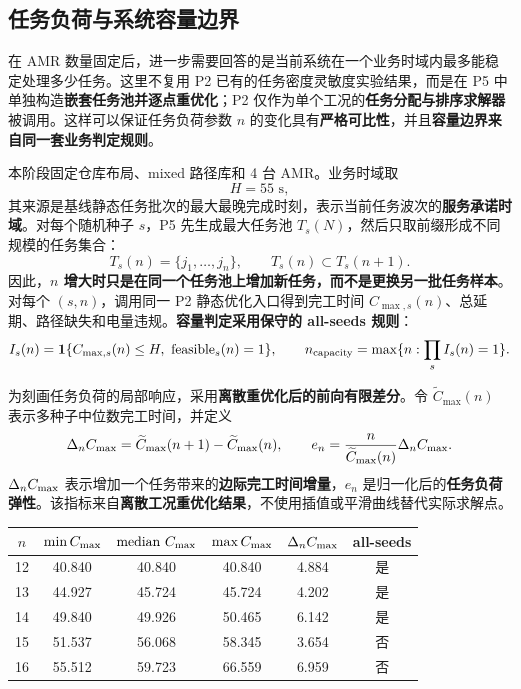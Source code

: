 \subsection{任务负荷与系统容量边界}

在 AMR 数量固定后，进一步需要回答的是当前系统在一个业务时域内最多能稳定处理多少任务。这里不复用 P2 已有的任务密度灵敏度实验结果，而是在 P5 中单独构造\textbf{嵌套任务池并逐点重优化}；P2 仅作为单个工况的\textbf{任务分配与排序求解器}被调用。这样可以保证任务负荷参数 $n$ 的变化具有\textbf{严格可比性}，并且\textbf{容量边界来自同一套业务判定规则}。

本阶段固定仓库布局、mixed 路径库和 4 台 AMR。业务时域取
\begin{equation}
H=55\text{ s},
\end{equation}
其来源是基线静态任务批次的最大最晚完成时刻，表示当前任务波次的\textbf{服务承诺时域}。对每个随机种子 $s$，P5 先生成最大任务池 $T_s(N)$，然后只取前缀形成不同规模的任务集合：
\begin{equation}
T_s(n)=\{j_1,\ldots,j_n\},\qquad T_s(n)\subset T_s(n+1).
\end{equation}
因此，\textbf{$n$ 增大时只是在同一个任务池上增加新任务，而不是更换另一批任务样本}。对每个 $(s,n)$，调用同一 P2 静态优化入口得到完工时间 $C_{\max,s}(n)$、总延期、路径缺失和电量违规。\textbf{容量判定采用保守的 all-seeds 规则}：
\begin{equation}
I_s(n)=\indicator\{C_{\max,s}(n)\le H,\ \text{feasible}_s(n)=1\},
\qquad
n_{\mathrm{capacity}}=\max\{n:\prod_s I_s(n)=1\}.
\end{equation}

为刻画任务负荷的局部响应，采用\textbf{离散重优化后的前向有限差分}。令
\(\widetilde{C}_{\max}(n)\) 表示多种子中位数完工时间，并定义
\begin{equation}
\Delta_n C_{\max}=\widetilde{C}_{\max}(n+1)-\widetilde{C}_{\max}(n),
\qquad
e_n=\frac{n}{\widetilde{C}_{\max}(n)}\Delta_n C_{\max}.
\end{equation}
$\Delta_nC_{\max}$ 表示增加一个任务带来的\textbf{边际完工时间增量}，$e_n$ 是归一化后的\textbf{任务负荷弹性}。该指标来自\textbf{离散工况重优化结果}，不使用插值或平滑曲线替代实际求解点。

\begin{center}
\small
{}
\label{tab:task-capacity-frontier}
\begin{tabular}{@{}cccccc@{}}
\toprule
$n$ & $\min C_{\max}$ & $\mathrm{median}\ C_{\max}$ & $\max C_{\max}$ & $\Delta_nC_{\max}$ & all-seeds \\
\midrule
12 & 40.840 & 40.840 & 40.840 & 4.884 & 是 \\
13 & 44.927 & 45.724 & 45.724 & 4.202 & 是 \\
14 & 49.840 & 49.926 & 50.465 & 6.142 & 是 \\
15 & 51.537 & 56.068 & 58.345 & 3.654 & 否 \\
16 & 55.512 & 59.723 & 66.559 & 6.959 & 否 \\
\bottomrule
\end{tabular}
\end{center}

